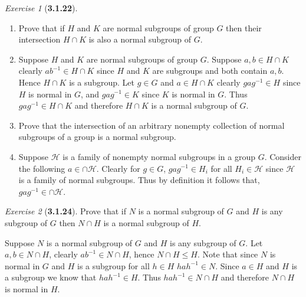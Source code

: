 \documentclass[12pt]{amsart}
\makeatletter
\theoremstyle{remark}
\newtheorem*{exercise}{Exercise}%
\renewenvironment{proof}[1][\proofname]{\par\doublespacing
  \pushQED{\qed}%
  \normalfont \topsep6\p@\@plus6\p@\relax
  \list{}{%
    \settowidth{\leftmargin}{\itshape\proofname:\hskip\labelsep}%
    \setlength{\labelwidth}{0pt}%
    \setlength{\itemindent}{-\leftmargin}%
  }%
  \item[\hskip\labelsep\itshape#1\@addpunct{:}]\ignorespaces
}{%
  \popQED\endlist\@endpefalse
  \singlespacing
}
\theoremstyle{mycomment}
\makeatother
\begin{document}
\begin{exercise}[\textbf{3.1.22}]
  \begin{enumerate}
    \item[a.] Prove that if $H$ and $K$ are normal subgroups of group $G$ then their intersection $H \cap K$ is
    also a normal subgroup of $G$.
    \begin{proof} Suppose $H$ and $K$ are normal subgroups of group $G$. Suppose $a, b \in H\cap K$ clearly $ab^{-1} \in H\cap K$ since 
      $H$ and $K$ are subgroups and both contain $a, b$. Hence $H \cap K$ is a subgroup. Let $g \in G$ and $a \in H \cap K$ clearly 
      $gag^{-1} \in H$ since $H$ is normal in $G$, and $gag^{-1} \in K$ since $K$ is normal in $G$. Thus $gag^{-1} \in H\cap K$ and therefore 
      $H \cap K$ is a normal subgroup of $G$. 
    \end{proof}
    
    \vspace{.15in}
    \item[b.] Prove that the intersection of an arbitrary nonempty collection of normal subgroups of a group is 
    a normal subgroup.
    \begin{proof} Suppose $\mathcal{H}$ is a family of nonempty normal subgroups in a group $G$. Consider the following 
    $a \in \cap \mathcal{H}$. Clearly for $g \in G$, $gag^{-1} \in H_i$ for all $H_i \in \mathcal{H}$ since $\mathcal{H}$ 
    is a family of normal subgroups. Thus by definition it follows that,  $gag^{-1} \in \cap \mathcal{H}$. 
    \end{proof}
  \end{enumerate}
\end{exercise}
\vspace{.15in}


\begin{exercise}[\textbf{3.1.24}] Prove that if $N$ is a normal subgroup of $G$ and $H$ is any subgroup of $G$ then $N\cap H$
  is a normal subgroup of $H$.
  \begin{proof} Suppose $N$ is a normal subgroup of $G$ and $H$ is any subgroup of $G$. Let $a, b \in N\cap H$, clearly 
    $ab^{-1} \in  N\cap H$, hence $N\cap H \leq H$. Note that since $N$ is normal in $G$ and $H$ is a subgroup for all $h \in H$
    $hah^{-1} \in N$. Since $a \in H$ and $H$ is a subgroup we know that $hah^{-1} \in H$. Thus $hah^{-1} \in N\cap H$ and therefore 
    $N\cap H$ is normal in $H$. 
  \end{proof}
\end{exercise}
\vspace{.15in}
\end{document}
